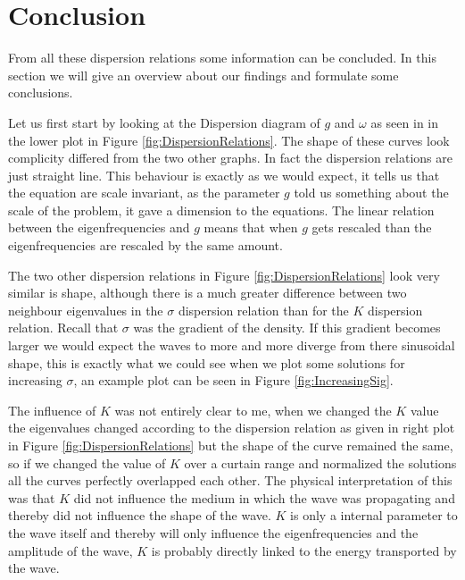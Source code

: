 \section{Conclusion}


From all these dispersion relations some information can be concluded.
In this section we will give an overview about our findings and formulate some conclusions.


Let us first start by looking at the Dispersion diagram of $ g $ and $ \omega $ as seen in in the lower plot in Figure \ref{fig:DispersionRelations}.
The shape of these curves look complicity differed from the two other graphs.
In fact the dispersion relations are just straight line.
This behaviour is exactly as we would expect, it tells us that the equation are scale invariant, as the parameter $ g $ told us something about the scale of the problem, it gave a dimension to the equations.
The linear relation between the eigenfrequencies and $ g $ means that when $ g $ gets rescaled than the eigenfrequencies are rescaled by the same amount.



The two other dispersion relations in  Figure \ref{fig:DispersionRelations} look very similar is shape, although there is a much greater difference between two neighbour eigenvalues in the $ \sigma $ dispersion relation than for the $ K $ dispersion relation.
Recall that $ \sigma $ was the gradient of the density.
If this gradient becomes larger we would expect the waves to more and more diverge from there sinusoidal shape, this is exactly what we could see when we plot some solutions for increasing $ \sigma $, an example plot can be seen in Figure \ref{fig:IncreasingSig}.


The influence of $ K $ was not entirely clear to me, when we changed the $ K $ value the eigenvalues changed according to the dispersion relation as given in right plot in Figure \ref{fig:DispersionRelations} but the shape of the curve remained the same, so if we changed the value of $ K $  over a curtain range and normalized the solutions all the curves perfectly overlapped each other.
The physical interpretation of this was that $ K $ did not influence the medium in which the wave was propagating and thereby did not influence the shape of the wave.
$ K $ is only a internal parameter to the wave itself and thereby will only influence the eigenfrequencies and the amplitude of the wave, $ K $ is probably directly linked to the energy transported by the wave.


